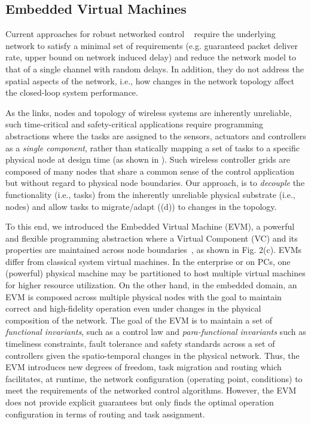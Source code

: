 \subsection{\textbf{Embedded Virtual Machines}}
Current approaches for robust networked control%
~\cite{ncs_survey} require the underlying network to satisfy a minimal set of requirements (e.g. guaranteed packet deliver rate, upper bound on network induced delay) and reduce the network model to that of a single channel with random delays. In addition, they do not address the spatial aspects of the network, i.e., how changes in the network topology affect the closed-loop system performance.

As the links, nodes and topology of wireless systems are inherently unreliable, such time-critical and safety-critical applications require programming abstractions where the tasks are assigned to the sensors, actuators and controllers as a \emph{single component}, rather than statically mapping a set of tasks to a specific physical node at design time (as shown in ). Such wireless controller grids are composed of many nodes that share a common sense of the control application but without regard to physical node boundaries. Our approach, is to \emph{decouple} the functionality (i.e., tasks) from the inherently unreliable physical substrate (i.e., nodes) and allow tasks to migrate/adapt ((d)) to changes in the topology. 

To this end, we introduced the Embedded Virtual Machine (EVM), a powerful and flexible programming abstraction where a Virtual Component (VC) and its properties are maintained across node boundaries~\cite{evm_rtas10,evm_tecs11}, as shown in Fig. 2(c). EVMs differ from classical system virtual machines. In the enterprise or on PCs, one (powerful) physical machine may be partitioned to host multiple virtual machines for higher resource utilization. On the other hand, in the embedded domain, an EVM is composed across multiple physical nodes with the goal to maintain correct and high-fidelity operation even under changes in the physical composition of the network. The goal of the EVM is to maintain a set of \emph{functional invariants}, such as a control law and \emph{para-functional invariants} such as timeliness constraints, fault tolerance and safety standards across a set of controllers given the spatio-temporal changes in the physical network. Thus, the EVM introduces new degrees of freedom, task migration and routing which facilitates, at runtime, the network configuration (operating point, conditions) to meet the requirements of the networked control algorithms. However, the EVM does not provide explicit guarantees but only finds the optimal operation configuration in terms of routing and task assignment.


